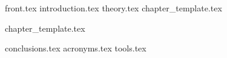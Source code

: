 \documentclass[10pt,twoside,openany, final]{report}
\begin{document}
{front.tex}
\setcounter{page}{0}
\listoftodos %
\tableofcontents
\setcounter{page}{0}
{introduction.tex}
{theory.tex}
{chapter_template.tex}



{chapter_template.tex}

{conclusions.tex}
\appendix
{acronyms.tex}
{tools.tex}

\printbibliography
{}
\end{document}
